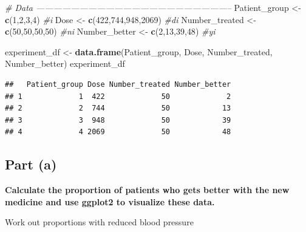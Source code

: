 \documentclass[
]{article}
\newenvironment{Shaded}{\begin{snugshade}}{\end{snugshade}}
\newcommand{\CommentTok}[1]{\textcolor[rgb]{0.56,0.35,0.01}{\textit{#1}}}
\newcommand{\DataTypeTok}[1]{\textcolor[rgb]{0.13,0.29,0.53}{#1}}
\newcommand{\DecValTok}[1]{\textcolor[rgb]{0.00,0.00,0.81}{#1}}
\newcommand{\KeywordTok}[1]{\textcolor[rgb]{0.13,0.29,0.53}{\textbf{#1}}}
\newcommand{\NormalTok}[1]{#1}
\newcommand{\OperatorTok}[1]{\textcolor[rgb]{0.81,0.36,0.00}{\textbf{#1}}}
\newcommand{\StringTok}[1]{\textcolor[rgb]{0.31,0.60,0.02}{#1}}
\begin{document}
\begin{Shaded}
\begin{Highlighting}[]
\CommentTok{# Data --------------------------------------------------------------------}
\NormalTok{Patient_group <-}\StringTok{ }\KeywordTok{c}\NormalTok{(}\DecValTok{1}\NormalTok{,}\DecValTok{2}\NormalTok{,}\DecValTok{3}\NormalTok{,}\DecValTok{4}\NormalTok{) }\CommentTok{#i}
\NormalTok{Dose <-}\StringTok{ }\KeywordTok{c}\NormalTok{(}\DecValTok{422}\NormalTok{,}\DecValTok{744}\NormalTok{,}\DecValTok{948}\NormalTok{,}\DecValTok{2069}\NormalTok{) }\CommentTok{#di}
\NormalTok{Number_treated <-}\StringTok{ }\KeywordTok{c}\NormalTok{(}\DecValTok{50}\NormalTok{,}\DecValTok{50}\NormalTok{,}\DecValTok{50}\NormalTok{,}\DecValTok{50}\NormalTok{) }\CommentTok{#ni}
\NormalTok{Number_better <-}\StringTok{ }\KeywordTok{c}\NormalTok{(}\DecValTok{2}\NormalTok{,}\DecValTok{13}\NormalTok{,}\DecValTok{39}\NormalTok{,}\DecValTok{48}\NormalTok{) }\CommentTok{#yi}

\NormalTok{experiment_df <-}\StringTok{ }\KeywordTok{data.frame}\NormalTok{(Patient_group, Dose, Number_treated, Number_better)}
\NormalTok{experiment_df}
\end{Highlighting}
\end{Shaded}

\begin{verbatim}
##   Patient_group Dose Number_treated Number_better
## 1             1  422             50             2
## 2             2  744             50            13
## 3             3  948             50            39
## 4             4 2069             50            48
\end{verbatim}

\hypertarget{part-a-1}{%
\subsection{\texorpdfstring{\textbf{Part
(a)}}{Part (a)}}\label{part-a-1}}

\textbf{Calculate the proportion of patients who gets better with the
new medicine and use ggplot2 to visualize these data.}

Work out proportions with reduced blood pressure

\begin{Shaded}
\end{Shaded}
\end{document}
